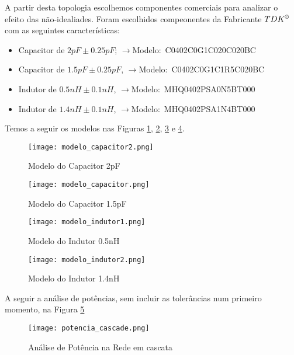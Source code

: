 \documentclass[a4paper,12pt]{proc}
\begin{document}
\noindent A partir desta topologia escolhemos componentes comerciais para analizar o efeito das não-idealiades. Foram escolhidos compeonentes da Fabricante $TDK^{\copyright}$ com as seguintes características:

\begin{itemize}
    \item Capacitor de $2pF \pm 0.25pF$; $\rightarrow$Modelo:~\textmd{C0402C0G1C020C020BC}
    \item Capacitor de $1.5pF \pm 0.25pF$, $\rightarrow$Modelo:~\textmd{C0402C0G1C1R5C020BC}
    \item Indutor de $0.5nH \pm 0.1nH$, $\rightarrow$Modelo:~\textmd{MHQ0402PSA0N5BT000}
    \item Indutor de $1.4nH \pm 0.1nH$, $\rightarrow$Modelo:~\textmd{MHQ0402PSA1N4BT000}
\end{itemize}

\noindent Temos a seguir os modelos nas Figuras \ref{cap1}, \ref{cap2}, \ref{ind1} e \ref{ind2}.

\begin{figure}[htbp]
    \centering
    \texttt{[image: modelo\_capacitor2.png]}
    \caption{Modelo do Capacitor 2pF}
    \label{cap1}
\end{figure}

\begin{figure}[htbp]
    \centering
    \texttt{[image: modelo\_capacitor.png]}
    \caption{Modelo do Capacitor 1.5pF}
    \label{cap2}
\end{figure}

\begin{figure}[htbp]
    \centering
    \texttt{[image: modelo\_indutor1.png]}
    \caption{Modelo do Indutor 0.5nH}
    \label{ind1}
\end{figure}

\begin{figure}[htbp]
    \centering
    \texttt{[image: modelo\_indutor2.png]}
    \caption{Modelo do Indutor 1.4nH}
    \label{ind2}
\end{figure}

\noindent A seguir a análise de potências, sem incluir as tolerâncias num primeiro momento, na Figura \ref{pot_cascade}

\singlespacing

\begin{figure}[htbp]
    \centering
    \texttt{[image: potencia\_cascade.png]}
    \caption{Análise de Potência na Rede em cascata}
    \label{pot_cascade}
\end{figure}
\end{document}
